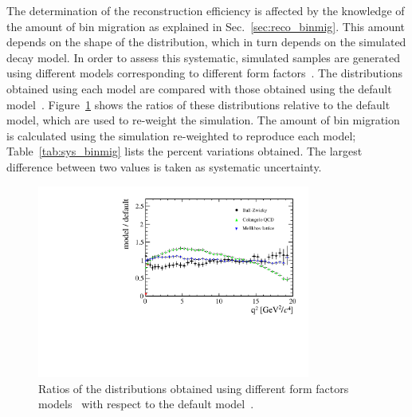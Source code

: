 The determination of the reconstruction efficiency is affected by the knowledge of the
amount of bin migration as explained in Sec.~\ref{sec:reco_binmig}. This amount depends
on the shape of the \qsq distribution, which in turn depends on the simulated \mbox{\BdToKstee} decay model.
In order to assess this systematic, simulated samples are generated using different
models corresponding to different form factors~\cite{Ball:2004ye,Aoki:2013ldr,Melikhov:2000yu}.
The \qsq distributions obtained using each model are compared with those obtained using
the default model~\cite{Ali:1999mm}.
Figure~\ref{fig:q2ratios} shows the ratios of these \qsq distributions relative to the default model, 
which are used to re-weight the simulation. The amount of bin migration is calculated
using the simulation re-weighted to reproduce each model; Table~\ref{tab:sys_binmig} lists the
percent variations obtained. The largest difference between two values is taken as systematic uncertainty.
\begin{table}[h!]
\centering
\caption{Variation on the level of bin migration (\%) obtained using different form factors models.}
\label{tab:sys_binmig}
\end{table}
%
\begin{figure}[h!]
\centering \includegraphics[width=0.8\textwidth]{RKst/figs/models_ratios.pdf}
\caption{Ratios of the \qsq distributions obtained using different form
factors models~\cite{Ball:2004ye,Aoki:2013ldr,Melikhov:2000yu} with respect 
to the default model~\cite{Ali:1999mm}. }
\label{fig:q2ratios}
\end{figure}
%




